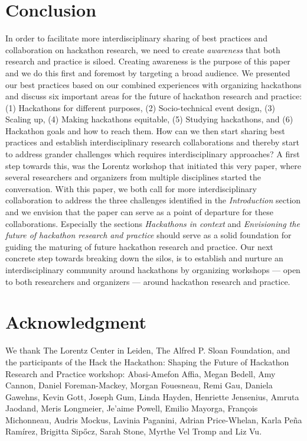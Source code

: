 \documentclass{ieeeaccess}
\begin{document}
\section{Conclusion}
\label{NextSteps}
In order to facilitate more interdisciplinary sharing of best practices and collaboration on hackathon research, we need to create \textit{awareness} that both research and practice is siloed.
Creating awareness is the purpose of this paper and we do this first and foremost by targeting a broad audience.
We presented our best practices based on our combined experiences with organizing hackathons and discuss six important areas for the future of hackathon research and practice: (1) Hackathons for different purposes, (2) Socio-technical event design, (3) Scaling up, (4) Making hackathons equitable, (5) Studying hackathons, and (6) Hackathon goals and how to reach them. 
How can we then start sharing best practices and establish interdisciplinary research collaborations and thereby start to address grander challenges which requires interdisciplinary approaches?
A first step towards this, was the Lorentz workshop that initiated this very paper, where several researchers and organizers from multiple disciplines started the conversation.
With this paper, we both call for more interdisciplinary collaboration to address the three challenges identified in the \textit{Introduction} section and we envision that the paper can serve as a point of departure for these collaborations.
Especially the sections \textit{Hackathons in context} and \textit{Envisioning the future of hackathon research and practice} should serve as a solid foundation for guiding the maturing of future hackathon research and practice.
Our next concrete step towards breaking down the silos, is to establish and nurture an interdisciplinary community around hackathons by organizing workshops --- open to both researchers and organizers --- around hackathon research and practice.


\section*{Acknowledgment}
We thank The Lorentz Center in Leiden, The Alfred P. Sloan Foundation, and the participants of the Hack the Hackathon: Shaping the Future of Hackathon Research and Practice workshop:
Abasi-Amefon Affia, 
Megan Bedell,
Amy Cannon,
Daniel Foreman-Mackey, 
Morgan Fouesneau, 
Remi Gau, 
Daniela Gawehns, 
Kevin Gott, 
Joseph Gum, 
Linda Hayden, 
Henriette Jensenius, 
Amruta Jaodand,
Meris Longmeier, 
Je’aime Powell,
Emilio Mayorga,
François Michonneau,
Audris Mockus, 
Lavinia Paganini,
Adrian Price-Whelan, 
Karla Peña Ramírez, 
Brigitta Sipőcz, 
Sarah Stone,
Myrthe Vel Tromp and Liz Vu.
\end{document}
